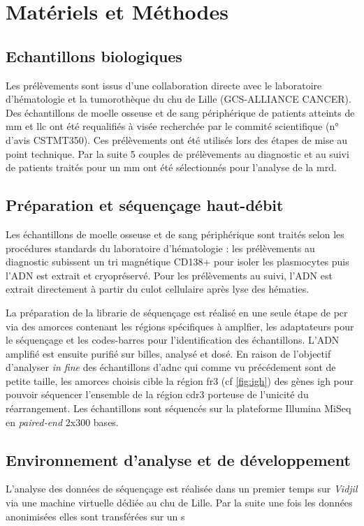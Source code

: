 \chapter{Matériels et Méthodes}

\section{Echantillons biologiques}

Les prélèvements sont issus d'une collaboration directe avec le laboratoire d'hématologie et la tumorothèque du 
\gls{chu} de Lille (GCS-ALLIANCE CANCER). Des échantillons de moelle osseuse et de sang périphérique de patients 
atteints de \gls{mm} et \gls{llc} ont été requalifiés à visée recherchée par le commité scientifique (n° d'avis CSTMT350). 
Ces prélèvements ont été utilisés lors des étapes de mise au point technique. Par la suite 5 couples de prélèvements 
au diagnostic et au suivi de patients traités pour un \gls{mm} ont été sélectionnés pour l'analyse de la \gls{mrd}.

\section{Préparation et séquençage haut-débit}

Les échantillons de moelle osseuse et de sang périphérique sont traités selon les procédures standards du laboratoire 
d'hématologie : les prélèvements au diagnostic subissent un tri magnétique CD138+ pour isoler les plasmocytes puis l'ADN 
est extrait et cryopréservé. Pour les prélèvements au suivi, l'ADN est extrait directement à partir du culot cellulaire 
après lyse des hématies.

La préparation de la librarie de séquençage est réalisé en une seule étape de \gls{pcr} via des amorces contenant les 
régions spécifiques à amplfier, les adaptateurs pour le séquençage et les codes-barres pour l'identification des échantillons.
L'ADN amplifié est ensuite purifié sur billes, analysé et dosé.
En raison de l'objectif d'analyser \textit{in fine} des échantillons d'\gls{adnc} qui comme vu précédement sont de petite taille, 
les amorces choisis cible la région \gls{fr}3 (cf \autoref{fig:igh}) des gènes \gls{igh} pour pouvoir séquencer l'ensemble de la 
région \gls{cdr}3 porteuse de l'unicité du réarrangement.
Les échantillons sont séquencés sur la plateforme Illumina MiSeq en \textit{paired-end} 2x300 bases.

\section{Environnement d'analyse et de développement}

L'analyse des données de séquençage est réalisée dans un premier temps sur \textit{Vidjil} via une machine virtuelle dédiée 
au \gls{chu} de Lille. Par la suite une fois les données anonimisées elles sont transférées sur un s

